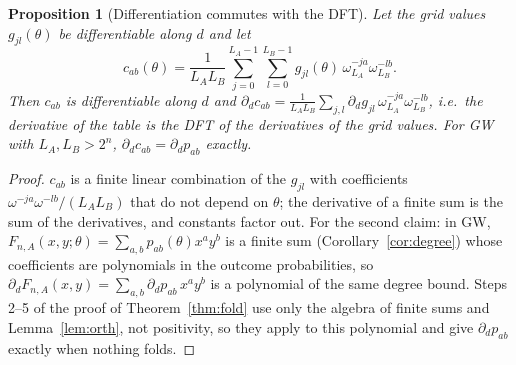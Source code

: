 \documentclass[11pt]{article}
\newtheorem{proposition}[theorem]{Proposition}
\theoremstyle{definition}
\theoremstyle{remark}
\begin{document}
\begin{proposition}[Differentiation commutes with the DFT]\label{prop:dftderiv}
Let the grid values $g_{jl}(\theta)$ be differentiable along $d$ and let
\[
c_{ab}(\theta)=\frac1{L_AL_B}\sum_{j=0}^{L_A-1}\sum_{l=0}^{L_B-1}g_{jl}(\theta)\,\omega_{L_A}^{-ja}\omega_{L_B}^{-lb}.
\]
Then $c_{ab}$ is differentiable along $d$ and $\partial_dc_{ab}=\frac1{L_AL_B}\sum_{j,l}\partial_dg_{jl}\,\omega_{L_A}^{-ja}\omega_{L_B}^{-lb}$, i.e.\ the derivative of the table is the DFT of the derivatives of the grid values. For GW with $L_A,L_B>2^n$, $\partial_dc_{ab}=\partial_dp_{ab}$ exactly.
\end{proposition}
\begin{proof}
$c_{ab}$ is a finite linear combination of the $g_{jl}$ with coefficients $\omega^{-ja}\omega^{-lb}/(L_AL_B)$ that do not depend on $\theta$; the derivative of a finite sum is the sum of the derivatives, and constants factor out. For the second claim: in GW, $F_{n,A}(x,y;\theta)=\sum_{a,b}p_{ab}(\theta)x^ay^b$ is a finite sum (Corollary~\ref{cor:degree}) whose coefficients are polynomials in the outcome probabilities, so $\partial_dF_{n,A}(x,y)=\sum_{a,b}\partial_dp_{ab}\,x^ay^b$ is a polynomial of the same degree bound. Steps 2--5 of the proof of Theorem~\ref{thm:fold} use only the algebra of finite sums and Lemma~\ref{lem:orth}, not positivity, so they apply to this polynomial and give $\partial_dp_{ab}$ exactly when nothing folds.
\end{proof}
\end{document}

